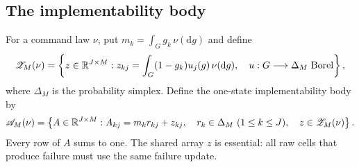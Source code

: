 \subsection{The implementability body}
For a command law $\nu$, put $m_k=\int_G g_k\,\nu(\mathrm dg)$ and define
\begin{equation}\label{eq:v33-allocation}
 \mathscr Z_M(\nu)=\left\{z\in\mathbb R^{J\times M}:
 z_{kj}=\int_G(1-g_k)u_j(g)\,\nu(\mathrm dg),\quad
 u:G\longrightarrow\Delta_M\ \hbox{Borel}\right\},
\end{equation}
where $\Delta_M$ is the probability simplex. Define the one-state
implementability body by
\begin{equation}\label{eq:v33-body}
 \mathscr A_M(\nu)=
 \left\{ A\in\mathbb R^{J\times M}: A_{kj}=m_k r_{kj}+z_{kj},\quad
       r_k\in\Delta_M\ (1\le k\le J),\quad z\in\mathscr Z_M(\nu)\right\}.
\end{equation}
Every row of $A$ sums to one. The shared array $z$ is essential: all
raw cells that produce failure must use the same failure update.


